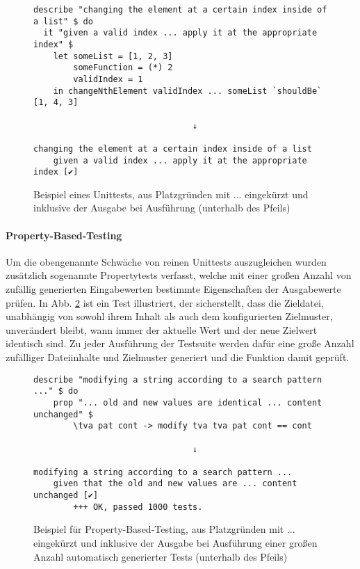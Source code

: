 \begin{figure}
    \caption{Beispiel eines Unittests, aus Platzgründen mit ... eingekürzt und inklusive
        der Ausgabe bei Ausführung (unterhalb des Pfeils)}
    \label{unit-test}
    \begin{verbatim}
describe "changing the element at a certain index inside of a list" $ do
  it "given a valid index ... apply it at the appropriate index" $
    let someList = [1, 2, 3]
        someFunction = (*) 2
        validIndex = 1
    in changeNthElement validIndex ... someList `shouldBe` [1, 4, 3]

                                ↓

changing the element at a certain index inside of a list
    given a valid index ... apply it at the appropriate index [✔]
    \end{verbatim}
\end{figure}

\paragraph{\gls{Property-Based-Testing}}
Um die obengenannte Schwäche von reinen Unittests auszugleichen wurden zusätzlich
sogenannte Propertytests verfasst, welche mit einer großen Anzahl von zufällig generierten
Eingabewerten bestimmte Eigenschaften der Ausgabewerte prüfen. In Abb. \ref{property-test}
ist ein Test illustriert, der sicherstellt, dass die Zieldatei, unabhängig von
sowohl ihrem Inhalt als auch dem konfigurierten \gls{Zielmuster}, unverändert
bleibt, wann immer der aktuelle Wert und der neue Zielwert identisch sind. Zu
jeder Ausführung der Testsuite werden dafür eine große Anzahl zufälliger Dateiinhalte
und Zielmuster generiert und die Funktion damit geprüft.

\begin{figure}
    \caption{Beispiel für \gls{Property-Based-Testing}, aus Platzgründen mit ... eingekürzt und inklusive
        der Ausgabe bei Ausführung einer großen Anzahl automatisch generierter Tests (unterhalb des Pfeils)}
    \label{property-test}
    \begin{verbatim}
describe "modifying a string according to a search pattern ..." $ do
    prop "... old and new values are identical ... content unchanged" $
        \tva pat cont -> modify tva tva pat cont == cont

                                ↓

modifying a string according to a search pattern ...
    given that the old and new values are ... content unchanged [✔]
        +++ OK, passed 1000 tests.
    \end{verbatim}
\end{figure}


